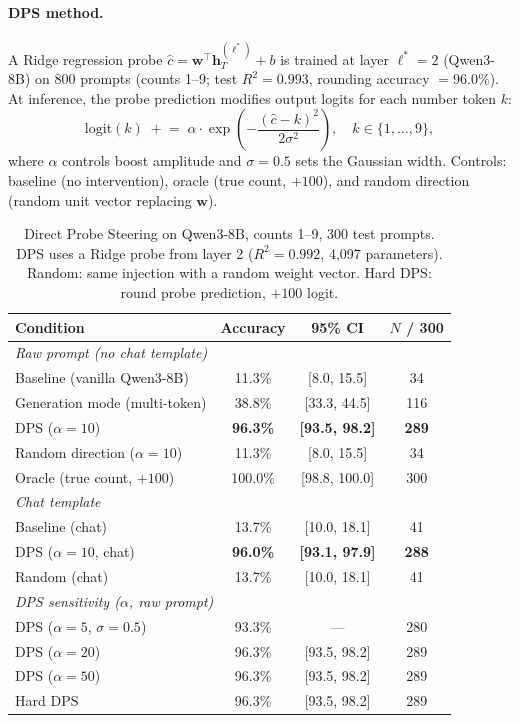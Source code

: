 \documentclass{article}
\begin{document}
\paragraph{DPS method.}
A Ridge regression probe $\hat{c} = \mathbf{w}^\top \mathbf{h}^{(\ell^*)}_T + b$
is trained at layer $\ell^* = 2$ (Qwen3-8B) on 800 prompts (counts 1--9; test $R^2 = 0.993$, rounding accuracy $= 96.0\%$).
At inference, the probe prediction modifies output logits for each number token $k$:
\begin{equation}
  \text{logit}(k) \;\mathrel{+}=\; \alpha \cdot \exp\!\left(-\frac{(\hat{c} - k)^2}{2\sigma^2}\right),
  \quad k \in \{1, \ldots, 9\},
  \label{eq:dps}
\end{equation}
where $\alpha$ controls boost amplitude and $\sigma = 0.5$ sets the Gaussian width.
Controls: baseline (no intervention), oracle (true count, $+100$), and random direction (random unit vector replacing $\mathbf{w}$).

\begin{table}[h]
\centering
\caption{Direct Probe Steering on Qwen3-8B, counts 1--9, 300 test prompts.
DPS uses a Ridge probe from layer 2 ($R^2 = 0.992$, 4{,}097 parameters).
Random: same injection with a random weight vector.
Hard DPS: round probe prediction, $+100$ logit.}
\label{tab:dps}
\begin{tabular}{lccc}
\toprule
Condition & Accuracy & 95\% CI & $N$ / 300 \\
\midrule
\multicolumn{4}{l}{\emph{Raw prompt (no chat template)}} \\
Baseline (vanilla Qwen3-8B) & 11.3\% & [8.0, 15.5] & 34 \\
Generation mode (multi-token) & 38.8\% & [33.3, 44.5] & 116 \\
DPS ($\alpha=10$) & \textbf{96.3\%} & \textbf{[93.5, 98.2]} & \textbf{289} \\
Random direction ($\alpha=10$) & 11.3\% & [8.0, 15.5] & 34 \\
Oracle (true count, $+100$) & 100.0\% & [98.8, 100.0] & 300 \\
\midrule
\multicolumn{4}{l}{\emph{Chat template}} \\
Baseline (chat) & 13.7\% & [10.0, 18.1] & 41 \\
DPS ($\alpha=10$, chat) & \textbf{96.0\%} & \textbf{[93.1, 97.9]} & \textbf{288} \\
Random (chat) & 13.7\% & [10.0, 18.1] & 41 \\
\midrule
\multicolumn{4}{l}{\emph{DPS sensitivity ($\alpha$, raw prompt)}} \\
DPS ($\alpha=5$, $\sigma=0.5$) & 93.3\% & --- & 280 \\
DPS ($\alpha=20$) & 96.3\% & [93.5, 98.2] & 289 \\
DPS ($\alpha=50$) & 96.3\% & [93.5, 98.2] & 289 \\
Hard DPS & 96.3\% & [93.5, 98.2] & 289 \\
\bottomrule
\end{tabular}
\end{table}
\end{document}
